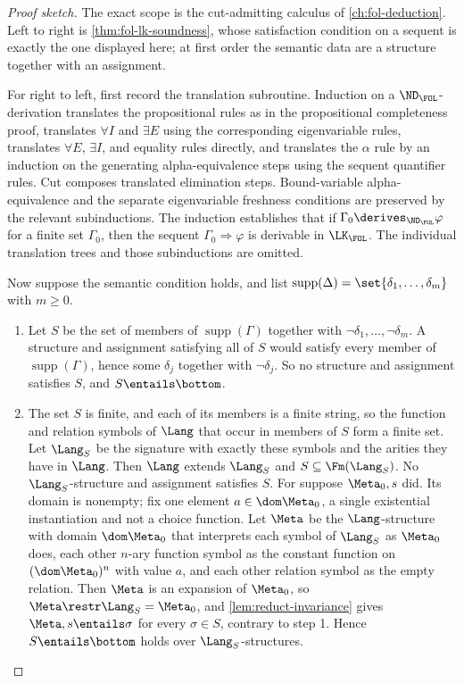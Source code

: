 \begin{proof}[Proof sketch]
The exact scope is the cut-admitting calculus of
\cref{ch:fol-deduction}.  Left to right is \cref{thm:fol-lk-soundness},
whose satisfaction condition on a sequent is exactly the one displayed
here; at first order the semantic data are a structure together with an
assignment.

For right to left, first record the translation subroutine.  Induction on
a \(\ND_{\FOL}\)-derivation translates the
propositional rules as in the propositional completeness proof, translates
\(\forall I\) and \(\exists E\) using the corresponding eigenvariable rules,
translates \(\forall E\), \(\exists I\), and equality rules directly, and
translates the \(\alpha\) rule by an induction on the generating
alpha-equivalence steps using the sequent quantifier rules.  Cut composes
translated elimination steps.  Bound-variable alpha-equivalence and the
separate eigenvariable freshness conditions are preserved by the relevant
subinductions.  The induction establishes that if
\(\Gamma_0\derives_{\ND_{\FOL}}\varphi\) for a finite set \(\Gamma_0\),
then the sequent \(\Gamma_0\Rightarrow\varphi\) is derivable in
\(\LK_{\FOL}\).  The individual translation trees and those subinductions
are omitted.

Now suppose the semantic condition holds, and list
\(\operatorname{supp}(\Delta)=\set{\delta_1,\ldots,\delta_m}\) with
\(m\geq0\).
\begin{enumerate}
  \item Let \(S\) be the set of members of
        \(\operatorname{supp}(\Gamma)\) together with
        \(\neg\delta_1,\ldots,\neg\delta_m\).  A structure and
        assignment satisfying all of \(S\) would satisfy every member
        of \(\operatorname{supp}(\Gamma)\), hence some \(\delta_j\)
        together with \(\neg\delta_j\).  So no structure and
        assignment satisfies \(S\), and \(S\entails\bottom\).
  \item The set \(S\) is finite, and each of its members is a finite
        string, so the function and relation symbols of \(\Lang\) that
        occur in members of \(S\) form a finite set.  Let \(\Lang_S\) be
        the signature with exactly these symbols and the arities they
        have in \(\Lang\).  Then \(\Lang\) extends \(\Lang_S\) and
        \(S\subseteq\Fm(\Lang_S)\).  No \(\Lang_S\)-structure and
        assignment satisfies \(S\).  For suppose \(\Meta_0,s\) did.  Its
        domain is nonempty; fix one element \(a\in\dom\Meta_0\), a single
        existential instantiation and not a choice function.  Let
        \(\Meta\) be the \(\Lang\)-structure with domain
        \(\dom\Meta_0\) that interprets each symbol of \(\Lang_S\) as
        \(\Meta_0\) does, each other \(n\)-ary function symbol as the
        constant function on \((\dom\Meta_0)^{n}\) with value \(a\), and
        each other relation symbol as the empty relation.  Then \(\Meta\)
        is an expansion of \(\Meta_0\), so \(\Meta\restr\Lang_S=\Meta_0\),
        and \cref{lem:reduct-invariance} gives \(\Meta,s\entails\sigma\)
        for every \(\sigma\in S\), contrary to step 1.  Hence
        \(S\entails\bottom\) holds over \(\Lang_S\)-structures.


\end{enumerate}
\end{proof}
